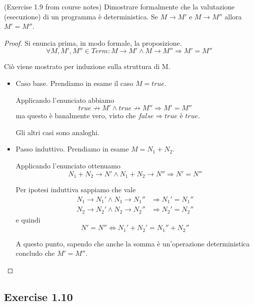 \documentclass[12pt,a4paper,oneside]{book}
\begin{document}
\begin{exercise}{(Exercise 1.9 from course notes)}
    Dimostrare formalmente che la valutazione (esecuzione) di un
    programma è deterministica. Se $M \to M'$ e $M \to M''$ allora $M'
    = M''$.

    \begin{proof}
        Si enuncia prima, in modo formale, la proposizione.
        \[
        \forall M, M', M'' \in Term: M \to M' \land M \to M'' \Rightarrow M' = M''
        \]
        
       	Ciò viene mostrato per induzione sulla struttura di M.
       	
       	\begin{itemize}
       		\item Caso base. Prendiamo in esame il caso $M = true$.
       		
       		Applicando l'enunciato abbiamo
       		\[
       		true \not\to M' \land true \not\to M'' \Rightarrow M' = M''
       		\]
       		ma questo è banalmente vero, visto che $false \Rightarrow
       		true$ è $true$.
       		
       		Gli altri casi sono analoghi.
       		
       		\item Passo induttivo. Prendiamo in esame $M = N_1 + N_2$.
       		
       		Applicando l'enunciato ottenuamo
       		\[
       		N_1 + N_2 \to N' \land N_1 + N_2 \to N'' \Rightarrow N' = N''
       		\]
       		
       		Per ipotesi induttiva sappiamo che vale
       		\begin{equation*}
       		\begin{split}
       		N_1 \to N_1' \land N_1 \to N_1'' & \Rightarrow N_1' = N_1'' \\
       		N_2 \to N_2' \land N_2 \to N_2'' & \Rightarrow N_2' = N_2''
       		\end{split}
       		\end{equation*}
       		e quindi
       		\[
       		N' = N'' \Leftrightarrow N_1' + N_2' = N_1'' + N_2''
       		\]
       		
       		A questo punto, sapendo che anche la somma è un'operazione
       		deterministica concludo che $M' = M''$.
       	\end{itemize}
    \end{proof}
\end{exercise}

\subsection{Exercise 1.10}
\end{document}
